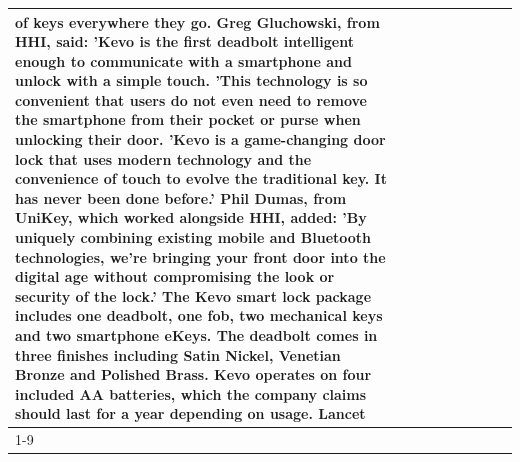 \begin{table}[H]
\begin{tabular}{lllrlllll}
of keys everywhere they go. Greg Gluchowski, from HHI, said: 'Kevo is the first deadbolt intelligent enough to communicate with a smartphone and unlock with a simple touch. 'This technology is so convenient that users do not even need to remove the smartphone from their pocket or purse when unlocking their door. 'Kevo is a game-changing door lock that uses modern technology and the convenience of touch to evolve the traditional key. It has never been done before.' Phil Dumas, from UniKey, which worked alongside HHI, added: 'By uniquely combining existing mobile and Bluetooth technologies, we’re bringing your front door into the digital age without compromising the look or security of the lock.' The Kevo smart lock package includes one deadbolt, one fob, two mechanical keys and two smartphone eKeys. The deadbolt comes in three finishes including Satin Nickel, Venetian Bronze and Polished Brass. Kevo operates on four included AA batteries, which the company claims should last for a year depending on usage. Lancet \\
\cline{1-9}

\end{tabular}
\end{table}
